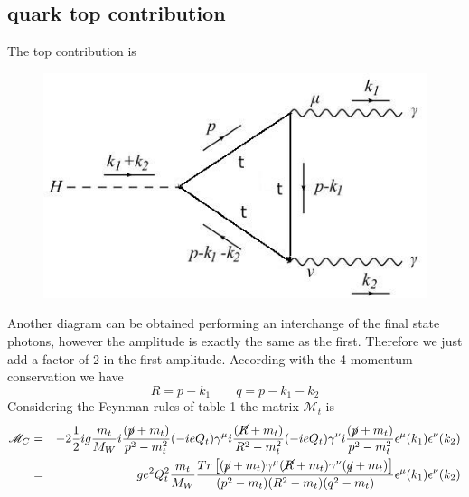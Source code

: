 \documentclass[a4paper,10pt]{article}
\begin{document}
\subsection{quark top contribution}
The top contribution is
\begin{figure}[h]
\begin{center}
\includegraphics[scale=0.5]{./foto3.jpeg}
\end{center}
\end{figure}
\newline
Another diagram can be obtained performing an interchange of the final state photons, however  the amplitude is exactly the same as the first. Therefore we just add a factor of 2 in the first amplitude. According with the 4-momentum conservation we have
\begin{equation}
R=p-k_1 \qquad q = p-k_1-k_2
\end{equation}
Considering the Feynman rules of table 1 the matrix $\mathscr{M}_{t}$ is
\begin{eqnarray*}
\mathscr{M}_C &=& -2\frac{1}{2}ig\frac{m_t}{M_W} i \frac{(\cancel{p}+m_t)}{p^2 -m_t^2}(-ie Q_t)\gamma^{\mu} i\frac{(\cancel{R}+m_t)}{R^2 -m_t^2} (-ie Q_t)\gamma^{\nu} i \frac{(\cancel{p}+m_t)}{p^2 -m_t^2}\epsilon^{\mu}(k_1)\epsilon^{\nu}(k_2) \\
&=& ge^2Q_t^2\frac{m_t}{M_W}\frac{Tr\left[(\cancel{p}+m_t)\gamma^{\mu}(\cancel{R}+m_t)\gamma^{\nu}(\cancel{q}+m_t)\right]}{(p^2-m_t)(R^2-m_t)(q^2-m_t)}\epsilon^{\mu}(k_1)\epsilon^{\nu}(k_2)
\end{eqnarray*}
\end{document}
